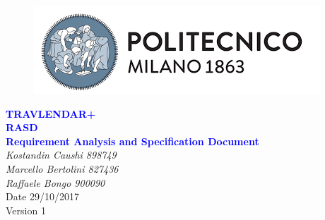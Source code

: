


	\begin{titlepage}
		\centering
		\begin{figure}
			\vspace*{0mm}
			\centering
			\includegraphics[scale=0.7]{Images/Polimi_Logo}
			\\[3cm]
		\end{figure}		
		\vspace{65mm}
		\textcolor{Blue}{\textbf{\Huge TRAVLENDAR+}}\\[15mm]
		\textcolor{Blue}{\textbf{\huge RASD}}\\[4mm]
		{\textcolor{Blue}{\textbf{\Large{Requirement Analysis and Specification Document}}}}\\
		\vspace{30mm}
		\textit{\large Kostandin Caushi 898749}\\[3mm]
		\textit{\large Marcello Bertolini 827436}\\[3mm]
		\textit{\large Raffaele Bongo 900090}\\[3mm]
		\vspace{30mm}
		Date 29/10/2017\\
		\vspace{10mm}
		Version 1
	\end{titlepage}

	\begin{center}
	\vspace*{-5mm}
	\renewcommand{\contentsname}{Table of Contents}
	\tableofcontents
	\newpage
	\listoffigures
	\newpage
    \end{center}
	
	\ttfamily
	\setlength{\emergencystretch}{45pt}
	
	\newpage
	
	\newpage
	
	\newpage
	
	\newpage
	
	\newpage
	

